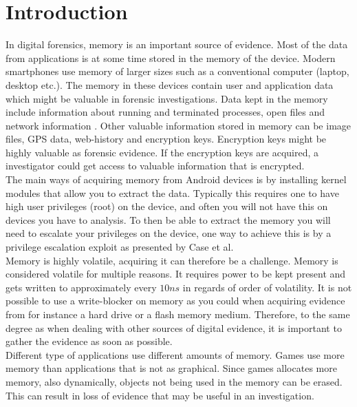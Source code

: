 \section{Introduction}

In digital forensics, memory is an important source of evidence. Most of the data from applications is at some time 
stored in the memory of the device. Modern smartphones use memory of larger sizes such as a conventional computer (laptop, 
desktop etc.). The memory in these devices contain user and application data which might be valuable in forensic 
investigations. Data kept in the memory include information about running and terminated processes, open files and 
network information \cite{acq_vol_android_mem}. Other valuable information stored in memory can be image files, GPS data, 
web-history and encryption keys. Encryption keys might be highly valuable as forensic evidence. If the encryption keys 
are acquired, a investigator could get access to valuable information that is encrypted. \\

The main ways of acquiring memory from Android devices is by installing kernel 
modules that allow you to extract the data. Typically this requires one to
have high user privileges (root) on the device, and often you will not have 
this on devices you have to analysis. To then be able to extract the memory you 
will need to escalate your privileges on the device, one way to achieve this is by
a privilege escalation exploit as presented by Case et al\cite{acq_vol_android_mem}.\\


Memory is highly volatile, acquiring it can therefore be a challenge. Memory is 
considered volatile for multiple reasons. It requires  power to be kept present
\cite{the_art_of_mem} and gets written to approximately every $10ns$ in regards
of order of volatility. %
It is not possible to use a write-blocker on memory as you could when acquiring 
evidence from for instance a hard drive or a flash memory medium. Therefore, to 
the same degree as when dealing with other sources of digital evidence, it is 
important to gather the evidence as soon as possible. \\

Different type of applications use different amounts of memory. Games use more 
memory than applications that is not as graphical. Since games allocates more 
memory, also dynamically, objects not being used in the memory can be erased. 
This can result in loss of evidence that may be useful in an investigation.\\

